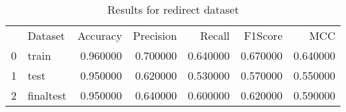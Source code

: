 \begin{table}
\caption{Results for redirect dataset}
\begin{tabular}{llrrrrr}
 & Dataset & Accuracy & Precision & Recall & F1Score & MCC \\
0 & train & 0.960000 & 0.700000 & 0.640000 & 0.670000 & 0.640000 \\
1 & test & 0.950000 & 0.620000 & 0.530000 & 0.570000 & 0.550000 \\
2 & finaltest & 0.950000 & 0.640000 & 0.600000 & 0.620000 & 0.590000 \\
\end{tabular}
\end{table}
